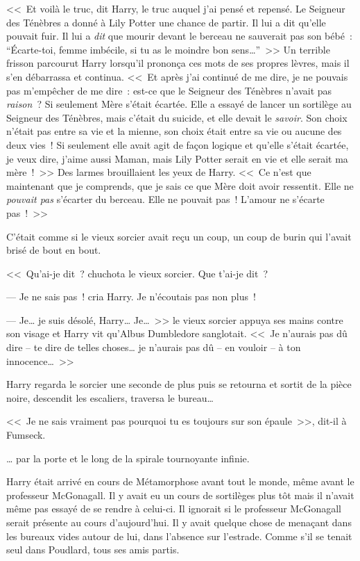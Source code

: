 <<~Et voilà le truc, dit Harry, le truc auquel j'ai pensé et repensé. Le Seigneur des Ténèbres a donné à Lily Potter une chance de partir. Il lui a dit qu'elle pouvait fuir. Il lui a \emph{dit} que mourir devant le berceau ne sauverait pas son bébé~: “Écarte-toi, femme imbécile, si tu as le moindre bon sens…”~>> Un terrible frisson parcourut Harry lorsqu'il prononça ces mots de ses propres lèvres, mais il s'en débarrassa et continua. <<~Et après j'ai continué de me dire, je ne pouvais pas m'empêcher de me dire~: est-ce que le Seigneur des Ténèbres n'avait pas \emph{raison}~? Si seulement Mère s'était écartée. Elle a essayé de lancer un sortilège au Seigneur des Ténèbres, mais c'était du suicide, et elle devait le \emph{savoir}. Son choix n'était pas entre sa vie et la mienne, son choix était entre sa vie ou aucune des deux vies~! Si seulement elle avait agit de façon logique et qu'elle s'était écartée, je veux dire, j'aime aussi Maman, mais Lily Potter serait en vie et elle serait ma mère~!~>> Des larmes brouillaient les yeux de Harry. <<~Ce n'est que maintenant que je comprends, que je sais ce que Mère doit avoir ressentit. Elle ne \emph{pouvait pas} s'écarter du berceau. Elle ne pouvait pas~! L'amour ne s'écarte pas~!~>>

C'était comme si le vieux sorcier avait reçu un coup, un coup de burin qui l'avait brisé de bout en bout.

<<~Qu'ai-je dit~? chuchota le vieux sorcier. Que t'ai-je dit~?

--- Je ne sais pas~! cria Harry. Je n'écoutais pas non plus~!

--- Je… je suis désolé, Harry… Je…~>> le vieux sorcier appuya ses mains contre son visage et Harry vit qu'Albus Dumbledore sanglotait. <<~Je n'aurais pas dû dire -- te dire de telles choses… je n'aurais pas dû -- en vouloir -- à ton innocence…~>>

Harry regarda le sorcier une seconde de plus puis se retourna et sortit de la pièce noire, descendit les escaliers, traversa le bureau…

<<~Je ne sais vraiment pas pourquoi tu es toujours sur son épaule~>>, dit-il à Fumseck.

… par la porte et le long de la spirale tournoyante infinie.

\later

Harry était arrivé en cours de Métamorphose avant tout le monde, même avant le professeur McGonagall. Il y avait eu un cours de sortilèges plus tôt mais il n'avait même pas essayé de se rendre à celui-ci. Il ignorait si le professeur McGonagall serait présente au cours d'aujourd'hui. Il y avait quelque chose de menaçant dans les bureaux vides autour de lui, dans l'absence sur l'estrade. Comme s'il se tenait seul dans Poudlard, tous ses amis partis.

